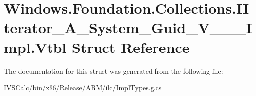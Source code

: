 \hypertarget{struct_windows_1_1_foundation_1_1_collections_1_1_i_iterator___a___system___guid___v_______impl_1_1_vtbl}{}\section{Windows.\+Foundation.\+Collections.\+I\+Iterator\+\_\+\+A\+\_\+\+System\+\_\+\+Guid\+\_\+\+V\+\_\+\+\_\+\+\_\+\+Impl.\+Vtbl Struct Reference}
\label{struct_windows_1_1_foundation_1_1_collections_1_1_i_iterator___a___system___guid___v_______impl_1_1_vtbl}


The documentation for this struct was generated from the following file\+:\begin{DoxyCompactItemize}
\item 
I\+V\+S\+Calc/bin/x86/\+Release/\+A\+R\+M/ilc/Impl\+Types.\+g.\+cs\end{DoxyCompactItemize}
